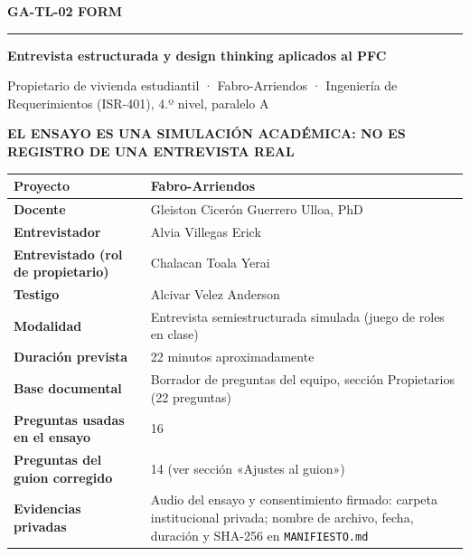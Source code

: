 \documentclass[11pt,a4paper]{article}
\begin{document}

{\color{azulfabro}\Huge\bfseries GA-TL-02 FORM\par}

\vspace{0.1cm}

{\color{lineaazul}\rule{\linewidth}{1.1pt}\par}

\vspace{0.25cm}

{\color{turquesafabro}\large\bfseries
Entrevista estructurada y design thinking aplicados al PFC\par}

{\color{turquesafabro}\normalsize
Propietario de vivienda estudiantil · Fabro-Arriendos · Ingeniería de Requerimientos (ISR-401), 4.º nivel, paralelo A\par}

\vspace{0.1cm}

{\small\bfseries\color{azulfabro}
EL ENSAYO ES UNA SIMULACIÓN ACADÉMICA: NO ES REGISTRO DE UNA ENTREVISTA REAL\par}

\vspace{0.35cm}

\renewcommand{\arraystretch}{1.28}

\begin{tabularx}{\linewidth}{
    |>{\bfseries\columncolor{fondotabla}}p{4.2cm}|X|
}
\hline
Proyecto & Fabro-Arriendos\\ \hline
Docente & Gleiston Cicerón Guerrero Ulloa, PhD\\ \hline
Entrevistador & Alvia Villegas Erick\\ \hline
Entrevistado (rol de propietario) & Chalacan Toala Yerai\\ \hline
Testigo & Alcivar Velez Anderson\\ \hline
Modalidad & Entrevista semiestructurada simulada (juego de roles en clase)\\ \hline
Duración prevista & 22 minutos aproximadamente\\ \hline
Base documental & Borrador de preguntas del equipo, sección Propietarios (22 preguntas)\\ \hline
Preguntas usadas en el ensayo & 16\\ \hline
Preguntas del guion corregido & 14 (ver sección «Ajustes al guion»)\\ \hline
Evidencias privadas & Audio del ensayo y consentimiento firmado: carpeta institucional privada; nombre de archivo, fecha, duración y SHA-256 en \texttt{MANIFIESTO.md}\\ \hline
\end{tabularx}
\end{document}
